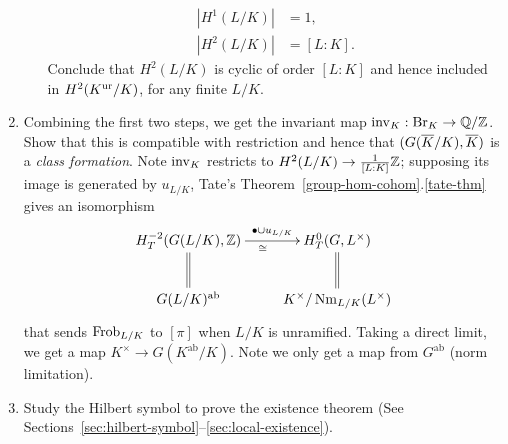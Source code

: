 \begin{enumerate}
\begin{enumerate}
\begin{align*}
|H^1(L/K)|&=1,\\
|H^2(L/K)|&=[L:K].
\end{align*}
Conclude that $H^2(L/K)$ is cyclic of order $[L:K]$ and hence included in $H^2(K^{\text{ur}}/K)$, for any finite $L/K$.
\end{enumerate}
\item Combining the first two steps, we get the invariant map $\operatorname{inv}_K:\operatorname{Br}_K\to \mathbb{Q}/\mathbb{Z}$. Show that this is compatible with restriction and hence that $(G(\overline{K}/K),\overline{K})$ is a {\it class formation}. 
Note $\operatorname{inv}_K$ restricts to $H^2(L/K)\to \frac{1}{[L:K]}\mathbb{Z}$; supposing its image is generated by $u_{L/K}$, Tate's Theorem~\ref{group-hom-cohom}.\ref{tate-thm} gives an isomorphism
\[
\xymatrix{
H_T^{-2}(G(L/K),\Z)\ar[r]^-{\bullet \cup u_{L/K}}_{\cong}\ar@{=}[d] & H_T^0(G,L^{\times})\ar@{=}[d]\\
G(L/K)^\text{ab}& K^{\times}/\nm_{L/K}(L^{\times})}
\]
that sends $\operatorname{Frob}_{L/K}$ to $[\pi]$ when $L/K$ is unramified. Taking a direct limit, we get a map $K^{\times}\to G(K^{\text{ab}}/K)$. 
Note we only get a map from $G^{\text{ab}}$ (norm limitation).
\item
Study the Hilbert symbol to prove the existence theorem (See Sections~\ref{sec:hilbert-symbol}--\ref{sec:local-existence}).
\end{enumerate}
